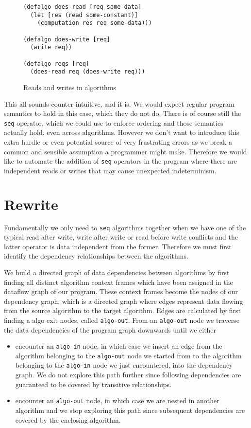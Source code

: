 \begin{figure}
\begin{verbatim}
(defalgo does-read [req some-data]
  (let [res (read some-constant)]
    (computation res req some-data)))

(defalgo does-write [req]
  (write req))

(defalgo reqs [req]
  (does-read req (does-write req)))
\end{verbatim}
\caption{Reads and writes in algorithms}
\label{fig:reads-and-writes-in-algos}
\end{figure}

This all sounds counter intuitive, and it is.
We would expect regular program semantics to hold in this case, which they do not do.
There is of course still the \texttt{seq} operator, which we could use to enforce ordering and those semantics actually hold, even across algorithms.
However we don't want to introduce this extra hurdle or even potential source of very frustrating errors as we break a common and sensible assumption a programmer might make.
Therefore we would like to automate the addition of \texttt{seq} operators in the program where there are independent reads or writes that may cause unexpected indeterminism.

\section{Rewrite}

Fundamentally we only need to \texttt{seq} algorithms together when we have one of the typical read after write, write after write or read before write conflicts and the latter operator is data independent from the former.
Therefore we must first identify the dependency relationships between the algorithms.

We build a directed graph of data dependencies between algorithms by first finding all distinct algorithm context frames which have been assigned in the dataflow graph of our program.
These context frames become the nodes of our dependency graph, which is a directed graph where edges represent data flowing from the source algorithm to the target algorithm.
Edges are calculated by first finding a algo exit nodes, called \texttt{algo-out}.
From an \texttt{algo-out} node we traverse the data dependencies of the program graph downwards until we either

\begin{itemize}
  \item encounter an \texttt{algo-in} node, in which case we insert an edge from the algorithm belonging to the \texttt{algo-out} node we started from to the algorithm belonging to the \texttt{algo-in} node we just encountered, into the dependency graph.
    We do not explore this path further since following dependencies are guaranteed to be covered by transitive relationships.
  \item encounter an \texttt{algo-out} node, in which case we are nested in another algorithm and we stop exploring this path since subsequent dependencies are covered by the enclosing algorithm.
\end{itemize}

